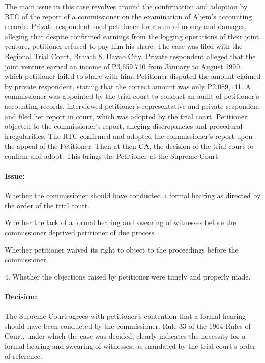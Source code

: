 \documentclass[
12pt,
oneside,
onehalfspacing,
headsepline
]{DigestCollection}
\begin{document}
The main issue in this case revolves around the confirmation and adoption by RTC of the report of a commissioner on the examination of Aljem's accounting records. Private respondent sued petitioner for a sum of money and damages, alleging that despite confirmed earnings from the logging operations of their joint venture, petitioner refused to pay him his share. The case was filed with the Regional Trial Court, Branch 8, Davao City. Private respondent alleged that the joint venture earned an income of P3,659,710 from January to August 1990, which petitioner failed to share with him. Petitioner disputed the amount claimed by private respondent, stating that the correct amount was only P2,089,141. A commissioner was appointed by the trial court to conduct an audit of petitioner's accounting records. interviewed petitioner's representative and private respondent and filed her report in court, which was adopted by the trial court. Petitioner objected to the commissioner's report, alleging discrepancies and procedural irregularities. The RTC confirmed and adopted the commissioner's report upon the appeal of the Petitioner. Then at then CA, the decision of the trial court to confirm and adopt. This brings the Petitioner at the Supreme Court.

\paragraph{Issue:}
\label{8a6cf520-115a-11ef-b8ef-a5537d38c9c8}


 Whether the commissioner should have conducted a formal hearing as directed by the order of the trial court.

Whether the lack of a formal hearing and swearing of witnesses before the commissioner deprived petitioner of due process.

Whether petitioner waived its right to object to the proceedings before the commissioner.

4. Whether the objections raised by petitioner were timely and properly made.

\paragraph{Decision:}
\label{8888a4c0-115a-11ef-b8ef-a5537d38c9c8}


The Supreme Court agrees with petitioner's contention that a formal hearing should have been conducted by the commissioner. Rule 33 of the 1964 Rules of Court, under which the case was decided, clearly indicates the necessity for a formal hearing and swearing of witnesses, as mandated by the trial court's order of reference.
\end{document}
